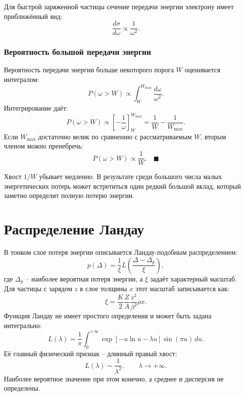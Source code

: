 \documentclass[
  russian,
  12pt,
  a4paper,
  a4paper,
  openany]{scrbook}
\begin{document}
Для быстрой заряженной частицы сечение передачи энергии электрону имеет
приближённый вид: \[\frac{d\sigma}{d\omega}\propto\frac{1}{\omega^2}.\]

\begin{bookderivation}

\subsubsection{Вероятность большой передачи
энергии}\label{ux432ux435ux440ux43eux44fux442ux43dux43eux441ux442ux44c-ux431ux43eux43bux44cux448ux43eux439-ux43fux435ux440ux435ux434ux430ux447ux438-ux44dux43dux435ux440ux433ux438ux438}

Вероятность передачи энергии больше некоторого порога \(W\) оценивается
интегралом: \[P(\omega>W)
\propto
\int_W^{W_{\max}}\frac{d\omega}{\omega^2}.\] Интегрирование даёт:
\[P(\omega>W)\propto
\left[-\frac{1}{\omega}\right]_{W}^{W_{\max}}=
\frac{1}{W}-\frac{1}{W_{\max}}.\] Если \(W_{\max}\) достаточно велик по
сравнению с рассматриваемым \(W\), вторым членом можно пренебречь:
\[\boxed{
P(\omega>W)\propto\frac{1}{W}.
}\quad\blacksquare\]

\end{bookderivation}

Хвост \(1/W\) убывает медленно. В результате среди большого числа малых
энергетических потерь может встретиться один редкий большой вклад,
который заметно определит полную потерю энергии.

\section{Распределение
Ландау}\label{ux440ux430ux441ux43fux440ux435ux434ux435ux43bux435ux43dux438ux435-ux43bux430ux43dux434ux430ux443}

В тонком слое потеря энергии описывается Ландау-подобным распределением:
\[\boxed{
p(\Delta)
=
\frac{1}{\xi}
L\!\left(\frac{\Delta-\Delta_p}{\xi}\right),
}\] где \(\Delta_p\) -- наиболее вероятная потеря энергии, а \(\xi\)
задаёт характерный масштаб. Для частицы с зарядом \(z\) в слое толщины
\(x\) этот масштаб записывается как: \[\xi=
\frac{K}{2}
\frac{Z}{A}
\frac{z^2}{\beta^2}
\rho x.\] Функция Ландау не имеет простого определения и может быть
задана интегрально: \[L(\lambda)
=
\frac{1}{\pi}
\int_0^{+\infty}
\exp[-u\ln u-\lambda u]\sin(\pi u)\,du.\] Её главный физический признак
-- длинный правый хвост: \[L(\lambda)\sim\frac{1}{\lambda^2},
\qquad
\lambda\to+\infty.\] Наиболее вероятное значение при этом конечно, а
среднее и дисперсия не определены.
\end{document}
